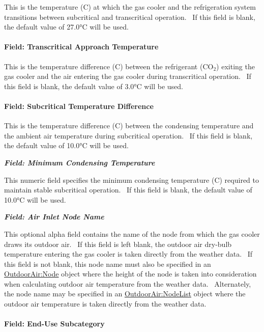 This is the temperature (C) at which the gas cooler and the refrigeration system transitions between subcritical and transcritical operation.~ If this field is blank, the default value of 27.0°C will be used.

\paragraph{Field: Transcritical Approach Temperature}\label{field-transcritical-approach-temperature}

This is the temperature difference (C) between the refrigerant (CO\(_{2}\)) exiting the gas cooler and the air entering the gas cooler during transcritical operation.~ If this field is blank, the default value of 3.0°C will be used.

\paragraph{Field: Subcritical Temperature Difference}\label{field-subcritical-temperature-difference}

This is the temperature difference (C) between the condensing temperature and the ambient air temperature during subcritical operation.~ If this field is blank, the default value of 10.0°C will be used.

\textbf{\emph{Field: Minimum Condensing Temperature}}

This numeric field specifies the minimum condensing temperature (C) required to maintain stable subcritical operation.~ If this field is blank, the default value of 10.0°C will be used.

\textbf{\emph{Field: Air Inlet Node Name}}

This optional alpha field contains the name of the node from which the gas cooler draws its outdoor air.~ If this field is left blank, the outdoor air dry-bulb temperature entering the gas cooler is taken directly from the weather data.~ If this field is not blank, this node name must also be specified in an \hyperref[outdoorairnode]{OutdoorAir:Node} object where the height of the node is taken into consideration when calculating outdoor air temperature from the weather data.~ Alternately, the node name may be specified in an \hyperref[outdoorairnodelist]{OutdoorAir:NodeList} object where the outdoor air temperature is taken directly from the weather data.

\paragraph{Field: End-Use Subcategory}\label{field-end-use-subcategory-7}

